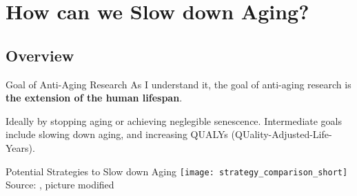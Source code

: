 \section{How can we Slow down Aging?}

\subsection{Overview}

\begin{frame}[c]{Goal of Anti-Aging Research}
    \large
    As I understand it, the goal of anti-aging research is \textbf{the extension of the human lifespan}.

    Ideally by stopping aging or achieving neglegible senescence.
    Intermediate goals include slowing down aging, and increasing QUALYs (QUality-Adjusted-Life-Years).
\end{frame}

\begin{frame}[c]{Potential Strategies to Slow down Aging}
    \texttt{[image: strategy\_comparison\_short]} \\
    Source: \cite{mahmoudi2019turning}, picture modified


\end{frame}


